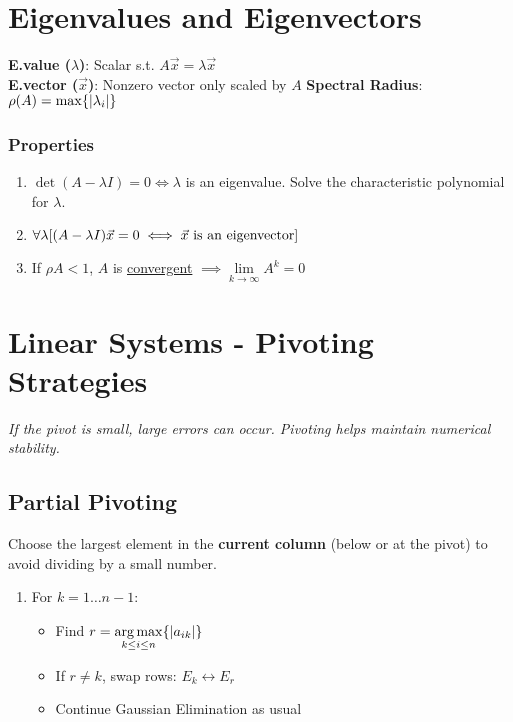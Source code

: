 \documentclass[8pt, letterpaper]{extarticle}
\begin{document}
\begin{multicols*}{3}
  \section{Eigenvalues and Eigenvectors}
  \textbf{E.value ($\lambda$)}: Scalar s.t. $A\vec{x} = \lambda \vec{x}$ \\
  \textbf{E.vector ($\vec{x}$)}: Nonzero vector only scaled by $A$
  \textbf{Spectral Radius}: $\rho(A) = \max \{\abs{\lambda_i}\}$
  \subsubsection{Properties}
  \begin{enumerate}
    \item $\det(A-\lambda I) = 0 \iff \lambda$ is an eigenvalue. Solve the
      characteristic polynomial for $\lambda$.
    \item $\forall \lambda \bqty{(A-\lambda I)\vec{x} = 0 \iff \vec x \text{ is an
      eigenvector}}$
    \item If $\rho A < 1$, $A$ is \uline{convergent} $\implies 
      \underset{k\to\infty}{\lim} A^k = 0$
  \end{enumerate}

  \section{Linear Systems - Pivoting Strategies}
  \textit{If the pivot is small, large errors can occur. Pivoting helps maintain numerical stability.}

  \subsection{Partial Pivoting}
  Choose the largest element in the \textbf{current column} (below or at the pivot) to avoid dividing by a small number.
  \begin{enumerate}
    \item For $k = 1 \dots n-1$:
      \begin{itemize}
        \item Find $r = \underset{k \leq i \leq n}{\arg\max} \Bqty{|a_{ik}|}$
        \item If $r \neq k$, swap rows: $E_k \leftrightarrow E_r$
        \item Continue Gaussian Elimination as usual
      \end{itemize}
  \end{enumerate}


\end{multicols*}
\end{document}
